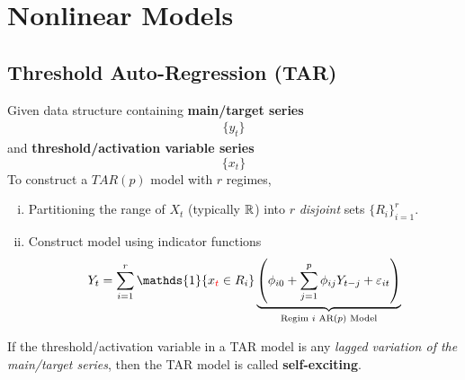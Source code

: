 \documentclass[11pt]{article}
\begin{document}
	\section{Nonlinear Models}
		\subsection{Threshold Auto-Regression (TAR)}
			\begin{definition}
				Given data structure containing \textbf{main/target series}
				\begin{gather}
					\{y_t\}
				\end{gather}
				and \textbf{threshold/activation variable series}
				\begin{equation}
					\{x_t\}
				\end{equation}
				To construct a $TAR(p)$ model with $r$ regimes, 
				\begin{enumerate}[(i)]
					\item Partitioning the range of $X_t$ (typically $\mathbb{R}$) into $r$ \emph{disjoint} sets $\{R_i\}_{i=1}^r$.
					\item Construct model using indicator functions
					\begin{equation}
						Y_t = \sum_{i=1}^r \mathds{1}\{x_{\red{t}} \in R_i\} 
						\underbrace{\left(
							\phi_{i0} + \sum_{j=1}^p \phi_{ij} Y_{t-j} + \varepsilon_{it}
						\right)}_{\tx{Regim $i$ AR($p$) Model}}
					\end{equation}
				\end{enumerate}
			\end{definition}
		
			\begin{definition}
				If the threshold/activation variable in a TAR model is any \emph{lagged variation of the main/target series}, then the TAR model is called \textbf{self-exciting}.
			\end{definition}
		
\end{document}
